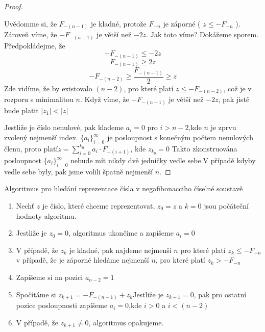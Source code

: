 \documentclass[czech,bachelor,dept470,male]{diploma}
\newcommand{\posla}{\{a_i\}_{i=0}^{\infty}}
\begin{document}
\begin{proof}
\begin{itemize}
		      Uvědomme si, že $F_{-(n-1)}$ je kladné, protože $F_{-n}$ je záporné ( $z\le-F_{-n}$ ). Zároveň víme, že $-F_{-(n-1)}$ je větší než $-2z$. Jak toto víme? Dokážeme sporem. Předpokládejme, že
		      $$-F_{-(n-1)} \le -2z$$
		      $$F_{-(n-1)} \ge 2z$$
		      $$-F_{-(n-2)}\ge\frac{F_{-(n-1)}}{2}\ge z$$
		      Zde vidíme, že by existovalo $(n-2)$, pro které platí $z\le-F_{-(n-2)}$, což je v rozporu s minimalitou $n$. Když víme, že $-F_{-(n-1)}$ je větší než $-2z$, pak jistě bude platit $|z_1|<|z|$
	\end{itemize}
	Jestliže je číslo nenulové, pak klademe $a_i=0$ pro $i>n-2$,\newline kde $n$ je zprvu zvolený nejmenší index. \newline
	$\posla$ je posloupnost s konečným počtem nenulových členu, proto platí\newline $z=\sum_{i=0}^{k_0}a_i\cdot F_{-(i+1)}$, kde $z_{k_0}=0$\newline
	Takto zkonstruována posloupnost $\posla$ nebude mít nikdy dvě jedničky vedle sebe.\newline V případě kdyby vedle sebe byly, pak jsme volili špatně nejmenší $n$.
\end{proof}
\begin{remark}\label{compAlg} Algoritmus pro hledání reprezentace čísla v negafibonacciho číselné soustavě
	\begin{enumerate}
		\item Nechť $z$ je číslo, které chceme reprezentovat, $z_0 = z$ a $k=0$ jsou počáteční hodnoty algoritmu.
		\item Jestliže je $z_0=0$, algoritmus ukončíme a zapíšeme $a_i=0$
		\item V případě, že $z_k$ je kladné, pak najdeme nejmenší $n$ pro které platí $z_k\le-F_{-n}$\newline v případě, že je záporné hledáme nejmenší $n$, pro které platí $z_k>-F_{-n}$
		\item Zapíšeme si na pozici $a_{n-2} = 1$
		\item Spočítáme si $z_{k+1} = -F_{-(n-1)}+z_k$\newline Jestliže je $z_{k+1}=0$, pak pro ostatní pozice posloupnosti zapíšeme $a_i=0$,\newline kde $i>0$ a $i<(n-2)$
		\item V případě, že $z_{k+1}\ne 0$, algoritmus opakujeme.
	\end{enumerate}
\end{remark}\newpage
\end{document}

